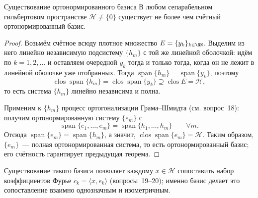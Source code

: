 \begin{Theorem}{Существование ортонормированного базиса}{}
	В любом сепарабельном гильбертовом пространстве $\mathcal{H} \neq \{0\}$ существует не более чем счётный ортонормированный базис.
\end{Theorem}

\begin{proof}
	Возьмём счётное всюду плотное множество $E = \{y_k\}_{k \in \NN}$. Выделим из него линейно независимую подсистему $\{h_m\}$ с той же линейной оболочкой: идём по $k = 1, 2, \ldots$ и оставляем очередной $y_k$ тогда и только тогда, когда он не лежит в линейной оболочке уже отобранных. Тогда $\operatorname{span}\{h_m\} = \operatorname{span}\{y_k\}$, поэтому
	\[
	\operatorname{clos}\operatorname{span}\{h_m\} = \operatorname{clos}\operatorname{span}\{y_k\} \supseteq \operatorname{clos} E = \mathcal{H},
	\]
	то есть система $\{h_m\}$ линейно независима и полна.

	Применим к $\{h_m\}$ процесс ортогонализации Грама--Шмидта (см. вопрос~18): получим ортонормированную систему $\{e_m\}$ с
	\[
	\operatorname{span}\{e_1, \ldots, e_m\} = \operatorname{span}\{h_1, \ldots, h_m\} \qquad \forall m.
	\]
	Отсюда $\operatorname{span}\{e_m\} = \operatorname{span}\{h_m\}$, а значит, $\operatorname{clos}\operatorname{span}\{e_m\} = \mathcal{H}$. Таким образом, $\{e_m\}$~--- полная ортонормированная система, то есть ортонормированный базис; его счётность гарантирует предыдущая теорема.
\end{proof}

\begin{Remark}{}{}
	Существование такого базиса позволяет каждому $x \in \mathcal{H}$ сопоставить набор коэффициентов Фурье $c_k = \langle x, e_k\rangle$ (вопросы~19--20); именно базис делает это сопоставление взаимно однозначным и изометричным.
\end{Remark}

